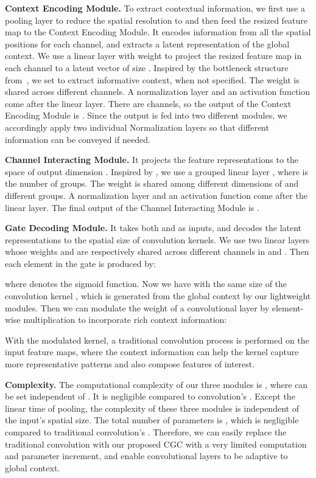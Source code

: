 \documentclass[runningheads]{llncs}
\begin{document}
\textbf{Context Encoding Module.}
To extract contextual information, we first use a pooling layer to reduce the spatial resolution to  and then feed the resized feature map to the Context Encoding Module. It encodes information from all the spatial positions for each channel, and extracts a latent representation of the global context. We use a linear layer with weight  to project the resized feature map in each channel to a latent vector of size . Inspired by the bottleneck structure from~\cite{He_2016_CVPR,hu2018squeeze,wang2017non,vaswani2017attention}, we set  to extract informative context, when not specified. The weight  is shared across different channels. A normalization layer and an activation function come after the linear layer. There are  channels, so the output of the Context Encoding Module is . Since the output is fed into two different modules, we accordingly apply two individual Normalization layers so that different information can be conveyed if needed.

\textbf{Channel Interacting Module.}
It projects the feature representations  to the space of output dimension . Inspired by \cite{ha2016hypernetworks}, we use a grouped linear layer , where  is the number of groups. The weight  is shared among different dimensions of  and different groups. A normalization layer and an activation function come after the linear layer. The final output of the Channel Interacting Module is .

\textbf{Gate Decoding Module.}
It takes both  and  as inputs, and decodes the latent representations to the spatial size of convolution kernels. We use two linear layers whose weights  and  are respectively shared across different channels in  and . Then each element in the gate  is produced by:

where  denotes the sigmoid function. Now we have  with the same size of the convolution kernel , which is generated from the global context by our lightweight modules. Then we can modulate the weight of a convolutional layer by element-wise multiplication to incorporate rich context information:

With the modulated kernel, a traditional convolution process is performed on the input feature maps, where the context information can help the kernel capture more representative patterns and also compose features of interest.


\textbf{Complexity.}
The computational complexity of our three modules is , where  can be set independent of . It is negligible compared to convolution's . Except the linear time of pooling, the complexity of these three modules is independent of the input's spatial size. The total number of parameters is , which is negligible compared to traditional convolution's . Therefore, we can easily replace the traditional convolution with our proposed CGC with a very limited computation and parameter increment, and enable convolutional layers to be adaptive to global context.
\end{document}
